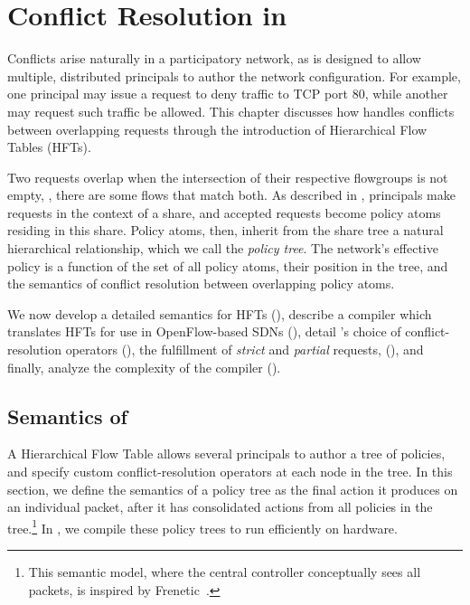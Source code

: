 \chapter{Conflict Resolution in \sys}
\label{sec:conflicts}

Conflicts arise naturally in a participatory network, as \sys is
designed to allow multiple, distributed principals to author the network configuration.
For example, one principal may issue a request to deny traffic to
TCP port 80, while another may request  such traffic be allowed.
This chapter discusses how \sys handles conflicts between overlapping requests
through the introduction of Hierarchical Flow Tables (HFTs).

Two requests overlap when the intersection of their
respective flowgroups is not empty, \ie, there are some flows that
match both.  As described in , principals
make requests in the context of a share, and accepted requests
become policy atoms residing in this share. Policy atoms, then,
inherit from the share tree a natural hierarchical relationship,
which we call the \emph{policy tree}. The network's effective policy is a function
of the set of all policy atoms, their position in the tree, and the
semantics of conflict resolution between overlapping policy atoms.

We now develop a detailed semantics for HFTs (),
describe a compiler which translates HFTs for use in OpenFlow-based SDNs (), 
detail \sys's choice of conflict-resolution operators (),
the fulfillment of \emph{strict} and \emph{partial} requests, (),
and finally, analyze the complexity of the \treelang compiler ().

\section{Semantics of \treelang}
\label{sec:Implementation}

A Hierarchical Flow Table allows several principals to author a tree of policies, and
specify custom conflict-resolution operators at each node in the
tree. In this section, we define the semantics of a policy tree as the
final action it produces on an individual packet, after it has
consolidated actions from all policies in the tree.\footnote{This
  semantic model, where the central controller conceptually sees all
  packets, is inspired by Frenetic~\cite{Foster:2010}.}
In , we compile these policy trees to run efficiently on hardware.

